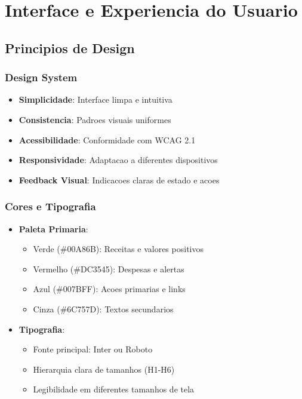 \section{Interface e Experiencia do Usuario}

\subsection{Principios de Design}

\subsubsection{Design System}
\begin{itemize}
    \item \textbf{Simplicidade}: Interface limpa e intuitiva
    \item \textbf{Consistencia}: Padroes visuais uniformes
    \item \textbf{Acessibilidade}: Conformidade com WCAG 2.1
    \item \textbf{Responsividade}: Adaptacao a diferentes dispositivos
    \item \textbf{Feedback Visual}: Indicacoes claras de estado e acoes
\end{itemize}

\subsubsection{Cores e Tipografia}
\begin{itemize}
    \item \textbf{Paleta Primaria}:
    \begin{itemize}
        \item Verde (\#00A86B): Receitas e valores positivos
        \item Vermelho (\#DC3545): Despesas e alertas
        \item Azul (\#007BFF): Acoes primarias e links
        \item Cinza (\#6C757D): Textos secundarios
    \end{itemize}
    \item \textbf{Tipografia}: 
    \begin{itemize}
        \item Fonte principal: Inter ou Roboto
        \item Hierarquia clara de tamanhos (H1-H6)
        \item Legibilidade em diferentes tamanhos de tela
    \end{itemize}
\end{itemize}

